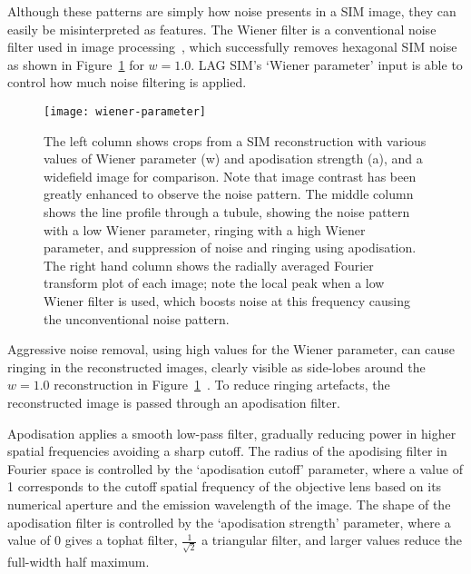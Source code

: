 Although these patterns are simply how noise presents in a SIM image, they can easily be misinterpreted as features. 
The Wiener filter is a conventional noise filter used in image processing~\cite[\textit{ch. 4}]{brown2012introduction}, which successfully removes hexagonal SIM noise as shown in Figure~\ref{fig:wiener-parameter} for $w=1.0$. 
LAG SIM's `Wiener parameter' input is able to control how much noise filtering is applied. 


\begin{figure}[p]
\centering
\texttt{[image: wiener-parameter]}
\caption[LAG SIM: The Wiener parameter and apodisation strength must be chosen to minimise artefacts]{The left column shows crops from a SIM reconstruction with various values of Wiener parameter (w) and apodisation strength (a), and a widefield image for comparison. Note that image contrast has been greatly enhanced to observe the noise pattern. The middle column shows the line profile through a tubule, showing the noise pattern with a low Wiener parameter, ringing with a high Wiener parameter, and suppression of noise and ringing using apodisation. The right hand column shows the radially averaged Fourier transform plot of each image; note the local peak when a low Wiener filter is used, which boosts noise at this frequency causing the unconventional noise pattern.}
\label{fig:wiener-parameter}
\end{figure}

Aggressive noise removal, using high values for the Wiener parameter, can cause ringing in the reconstructed images, clearly visible as side-lobes around the $w=1.0$ reconstruction in Figure~\ref{fig:wiener-parameter}~\cite{righolt2013image}. 
To reduce ringing artefacts, the reconstructed image is passed through an apodisation filter. 

Apodisation applies a smooth low-pass filter, gradually reducing power in higher spatial frequencies avoiding a sharp cutoff. 
The radius of the apodising filter in Fourier space is controlled by the `apodisation cutoff' parameter, where a value of 1 corresponds to the cutoff spatial frequency of the objective lens based on its numerical aperture and the emission wavelength of the image. 
The shape of the apodisation filter is controlled by the `apodisation strength' parameter, where a value of 0 gives a tophat filter, $\frac{1}{\sqrt{2}}$ a triangular filter, and larger values reduce the full-width half maximum. %

